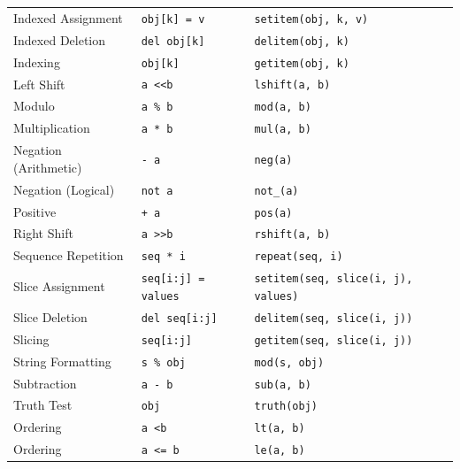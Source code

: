 \documentclass{l4proj}
\begin{document}
\begin{table}[]
\begin{tabular}{@{}lll@{}}
    Indexed Assignment    & \texttt{obj{[}k{]} = v}                 & \texttt{setitem(obj, k, v)}                           \\
    Indexed Deletion      & \texttt{del obj{[}k{]}}                 & \texttt{delitem(obj, k)}                              \\
    Indexing              & \texttt{obj{[}k{]}}                     & \texttt{getitem(obj, k)}                              \\
    Left Shift            & \texttt{a \textless{}\textless b}       & \texttt{lshift(a, b)}                                 \\
    Modulo                & \texttt{a \% b}                         & \texttt{mod(a, b)}                                    \\
    Multiplication        & \texttt{a * b}                          & \texttt{mul(a, b)}                                    \\
    Negation (Arithmetic) & \texttt{- a}                            & \texttt{neg(a)}                                       \\
    Negation (Logical)    & \texttt{not a}                          & \texttt{not\_(a)}                                     \\
    Positive              & \texttt{+ a}                            & \texttt{pos(a)}                                       \\
    Right Shift           & \texttt{a \textgreater{}\textgreater b} & \texttt{rshift(a, b)}                                 \\
    Sequence Repetition   & \texttt{seq * i}                        & \texttt{repeat(seq, i)}                               \\
    Slice Assignment      & \texttt{seq{[}i:j{]} = values}          & \texttt{setitem(seq, slice(i, j), values)}            \\
    Slice Deletion        & \texttt{del seq{[}i:j{]}}               & \texttt{delitem(seq, slice(i, j))}                    \\
    Slicing               & \texttt{seq{[}i:j{]}}                   & \texttt{getitem(seq, slice(i, j))}                    \\
    String Formatting     & \texttt{s \% obj}                       & \texttt{mod(s, obj)}                                  \\
    Subtraction           & \texttt{a - b}                          & \texttt{sub(a, b)}                                    \\
    Truth Test            & \texttt{obj}                            & \texttt{truth(obj)}                                   \\
    Ordering              & \texttt{a \textless b}                  & \texttt{lt(a, b)}                                     \\
    Ordering              & \texttt{a \textless{}= b}               & \texttt{le(a, b)}                                     \\
    \end{tabular}
    \end{table}
\end{document}
